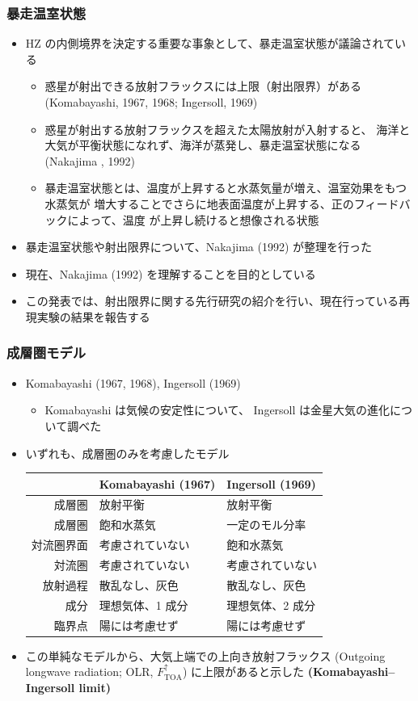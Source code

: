 \documentclass[aspectratio=149,9pt]{beamer}
\newcommand{\hmemph}[1]{\textbf{#1}}
\newcommand{\hmTOA}{\mathrm{TOA}}
\begin{document}
\begin{frame}
	\frametitle{暴走温室状態}
	\begin{itemize}
		\item HZ の内側境界を決定する重要な事象として、暴走温室状態が議論されている
			\begin{itemize}
				\item 惑星が射出できる放射フラックスには上限（射出限界）がある
					(Komabayashi, 1967, 1968; Ingersoll, 1969)
				\item 惑星が射出する放射フラックスを超えた太陽放射が入射すると、
					海洋と大気が平衡状態になれず、海洋が蒸発し、暴走温室状態になる
					(Nakajima \etal*, 1992)
				\item 暴走温室状態とは、温度が上昇すると水蒸気量が増え、温室効果をもつ水蒸気が
					増大することでさらに地表面温度が上昇する、正のフィードバックによって、温度
					が上昇し続けると想像される状態
			\end{itemize}
		\item 暴走温室状態や射出限界について、Nakajima \etal (1992) が整理を行った
		\item 現在、Nakajima \etal (1992) を理解することを目的としている
		\item この発表では、射出限界に関する先行研究の紹介を行い、現在行っている再現実験の結果を報告する
	\end{itemize}
\end{frame}

\begin{frame}
	\frametitle{成層圏モデル}
	\begin{itemize}
		\item Komabayashi (1967, 1968), Ingersoll (1969)
			\begin{itemize}
				\item Komabayashi は気候の安定性について、
					Ingersoll は金星大気の進化について調べた
			\end{itemize}
		\item いずれも、成層圏のみを考慮したモデル
			\begin{table}
				\centering\small
				\begin{tabular}{rll}
					\hline
					 &Komabayashi (1967)&Ingersoll (1969)\\
					 \hline
					成層圏&放射平衡&放射平衡\\
					成層圏&飽和水蒸気&一定のモル分率\\
					対流圏界面&考慮されていない&飽和水蒸気\\
					対流圏&考慮されていない&考慮されていない\\
					放射過程&散乱なし、灰色&散乱なし、灰色\\
					成分&理想気体、1 成分&理想気体、2 成分\\
					臨界点&陽には考慮せず&陽には考慮せず\\
					\hline
				\end{tabular}
			\end{table}
		\item この単純なモデルから、大気上端での上向き放射フラックス
			(Outgoing longwave radiation; OLR, \(F^\uparrow_\hmTOA\))
			に上限があると示した \hmemph{(Komabayashi--Ingersoll limit)}
	\end{itemize}
\end{frame}
\end{document}

